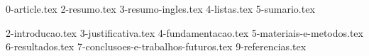 \documentclass{artigo-abnt}
\begin{document}
{0-article.tex}
{2-resumo.tex}
{3-resumo-ingles.tex}
{4-listas.tex}
{5-sumario.tex}

{2-introducao.tex}
{3-justificativa.tex}
{4-fundamentacao.tex}
{5-materiais-e-metodos.tex}
{6-resultados.tex}
{7-conclusoes-e-trabalhos-futuros.tex}
{9-referencias.tex}
\end{document}
